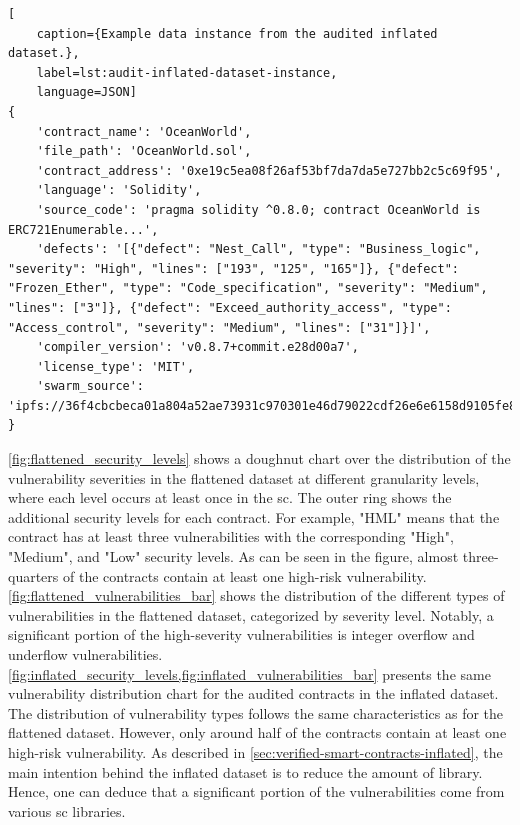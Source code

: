 

\begin{lstlisting}[
    caption={Example data instance from the audited inflated dataset.},
    label=lst:audit-inflated-dataset-instance,
    language=JSON]
{
    'contract_name': 'OceanWorld',
    'file_path': 'OceanWorld.sol',
    'contract_address': '0xe19c5ea08f26af53bf7da7da5e727bb2c5c69f95',
    'language': 'Solidity',
    'source_code': 'pragma solidity ^0.8.0; contract OceanWorld is ERC721Enumerable...',
    'defects': '[{"defect": "Nest_Call", "type": "Business_logic", "severity": "High", "lines": ["193", "125", "165"]}, {"defect": "Frozen_Ether", "type": "Code_specification", "severity": "Medium", "lines": ["3"]}, {"defect": "Exceed_authority_access", "type": "Access_control", "severity": "Medium", "lines": ["31"]}]',
    'compiler_version': 'v0.8.7+commit.e28d00a7',
    'license_type': 'MIT',
    'swarm_source': 'ipfs://36f4cbcbeca01a804a52ae73931c970301e46d79022cdf26e6e6158d9105fe83'
}
\end{lstlisting}

\cref{fig:flattened_security_levels} shows a doughnut chart over the distribution of the vulnerability severities in the flattened dataset at different granularity levels, where each level occurs at least once in the \acrshort{sc}. The outer ring shows the additional security levels for each contract. For example, "HML" means that the contract has at least three vulnerabilities with the corresponding "High", "Medium", and "Low" security levels. As can be seen in the figure, almost three-quarters of the contracts contain at least one high-risk vulnerability. \cref{fig:flattened_vulnerabilities_bar} shows the distribution of the different types of vulnerabilities in the flattened dataset, categorized by severity level. Notably, a significant portion of the high-severity vulnerabilities is integer overflow and underflow vulnerabilities. \cref{fig:inflated_security_levels,fig:inflated_vulnerabilities_bar} presents the same vulnerability distribution chart for the audited contracts in the inflated dataset. The distribution of vulnerability types follows the same characteristics as for the flattened dataset. However, only around half of the contracts contain at least one high-risk vulnerability. As described in \cref{sec:verified-smart-contracts-inflated}, the main intention behind the inflated dataset is to reduce the amount of library. Hence, one can deduce that a significant portion of the vulnerabilities come from various \acrshort{sc} libraries.

